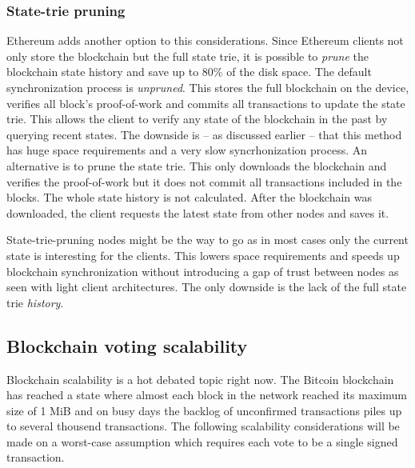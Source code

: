 \documentclass[9pt,oneside]{amsart}
\begin{document}
\begin{multicols}{2}
\subsubsection{State-trie pruning}
Ethereum adds another option to this considerations. Since Ethereum clients not only store the blockchain but the full state trie, it is possible to \textit{prune} the blockchain state history and save up to 80\% of the disk space. The default synchronization process is \textit{unpruned}. This stores the full blockchain on the device, verifies all block's proof-of-work and commits all transactions to update the state trie. This allows the client to verify any state of the blockchain in the past by querying recent states. The downside is -- as discussed earlier -- that this method has huge space requirements and a very slow syncrhonization process. An alternative is to prune the state trie. This only downloads the blockchain and verifies the proof-of-work but it does not commit all transactions included in the blocks. The whole state history is not calculated. After the blockchain was downloaded, the client requests the latest state from other nodes and saves it.\par
State-trie-pruning nodes might be the way to go as in most cases only the current state is interesting for the clients. This lowers space requirements and speeds up blockchain synchronization without introducing a gap of trust between nodes as seen with light client architectures. The only downside is the lack of the full state trie \textit{history}.

\subsection{Blockchain voting scalability}
Blockchain scalability is a hot debated topic right now. The Bitcoin blockchain has reached a state where almost each block in the network reached its maximum size of 1 MiB and on busy days the backlog of unconfirmed transactions piles up to several thousend transactions. The following scalability considerations will be made on a worst-case assumption which requires each vote to be a single signed transaction.

\end{multicols}
\end{document}
